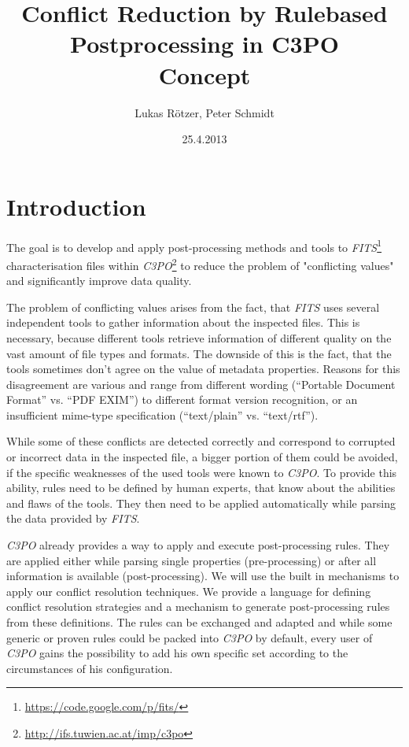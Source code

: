 \documentclass[a4paper,12pt]{article}
\title{Conflict Reduction by Rulebased Postprocessing in C3PO\\ \medskip Concept}
\author{Lukas Rötzer, Peter Schmidt}
\date{25.4.2013}
\begin{document}
\maketitle
\thispagestyle{empty}

\clearpage



\section{Introduction}

The goal is to develop and apply post-processing methods and tools to \emph{FITS}\footnote{\url{https://code.google.com/p/fits/}} characterisation files within \emph{C3PO}\footnote{\url{http://ifs.tuwien.ac.at/imp/c3po}} to reduce the problem of "conflicting values" and significantly improve data quality. 

The problem of conflicting values arises from the fact, that \emph{FITS} uses several independent tools to gather information about the inspected files. This is necessary, because different tools retrieve information of different quality on the vast amount of file types and formats. The downside of this is the fact, that the tools sometimes don't agree on the value of metadata properties. Reasons for this disagreement are various and range from different wording (``Portable Document Format'' vs. ``PDF EXIM'') to different format version recognition, or an insufficient mime-type specification (``text/plain'' vs. ``text/rtf''). 

While some of these conflicts are detected correctly and correspond to corrupted or incorrect data in the inspected file, a bigger portion of them could be avoided, if the specific weaknesses of the used tools were known to \emph{C3PO}. To provide this ability, rules need to be defined by human experts, that know about the abilities and flaws of the tools. They then need to be applied automatically while parsing the data provided by \emph{FITS}. 

\emph{C3PO} already provides a way to apply and execute post-processing rules. They are applied either while parsing single properties (pre-processing) or after all information is available (post-processing). We will use the built in mechanisms to apply our conflict resolution techniques. We provide a language for defining conflict resolution strategies and a mechanism to generate post-processing rules from these definitions. The rules can be exchanged and adapted and while some generic or proven rules could be packed into \emph{C3PO} by default, every user of \emph{C3PO} gains the possibility to add his own specific set according to the circumstances of his configuration.
\end{document}
